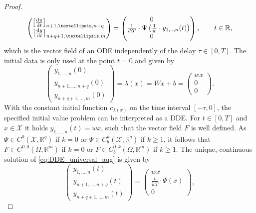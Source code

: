 \documentclass[10pt,a4paper]{amsart}
\newcommand*{\dd}{\mathrm{d}}
\begin{document}
\begin{proof}
\begin{equation}
\begin{pmatrix}
				\big[\frac{\dd y}{\dd t}	\big]_{n+1,\ldots,n+q}\textcolor{white}{.} \\
				\big[\frac{\dd y}{\dd t}\big]_{n+q+1,\ldots,m}
			\end{pmatrix}
			= 
			\begin{pmatrix}
				0 \textcolor{white}{\big[\frac{1}{1}\big]_1}\\
				\frac{1}{\tilde w T} \cdot \Psi\left(\frac{1}{w}\cdot y_{1,..,n}(t)\right)\\
				0 \textcolor{white}{\big[\frac{1}{1}\big]_1}
			\end{pmatrix}, \qquad t\in\mathbb{R},
		\end{equation}
		which is the vector field of an ODE independently of the delay $\tau\in[0,T]$. The initial data is only used at the point $t = 0$ and given by
		\begin{equation*}
			\begin{pmatrix}
				y_{1,\ldots,n}(0) \\
				y_{n+1,\ldots,n+q}(0) \\
				y_{n+q+1,\ldots,m}(0)
			\end{pmatrix}
			= \lambda(x) = Wx+b = \begin{pmatrix}
				wx \\ 0 \\ 0
			\end{pmatrix}.
		\end{equation*} 
		With the constant initial function $c_{\lambda(x)}$ on the time interval $[-\tau,0]$, the specified initial value problem can be interpreted as a DDE. For $t\in[0,T]$ and $x\in\mathcal{X}$ it holds $y_{1,\ldots,n}(t) = wx$, such that the vector field $F$ is well defined. As $\Psi\in C^0(\mathcal{X}, \mathbb{R}^q)$ if $k = 0$ or $\Psi\in C^k_b(\mathcal{X},\mathbb{R}^q)$ if $k\geq 1$, it follows that $F \in C^{0,0}(\Omega,\mathbb{R}^m)$ if $k = 0$ or $F\in C_b^{0,k}(\Omega,\mathbb{R}^m)$ if $k\geq 1$. The unique, continuous solution of \eqref{eq:DDE_universal_aug} is given by
		\begin{equation*}
			\begin{pmatrix}
				y_{1,\ldots,n}(t) \\
				y_{n+1,\ldots,n+q}(t) \\
				y_{n+q+1,\ldots,m}(t)
			\end{pmatrix}
			=  \begin{pmatrix}
				wx \\ \frac{t}{\tilde w T} \cdot \Psi(x) \\ 0
			\end{pmatrix},

\end{equation*}
\end{proof}
\end{document}
